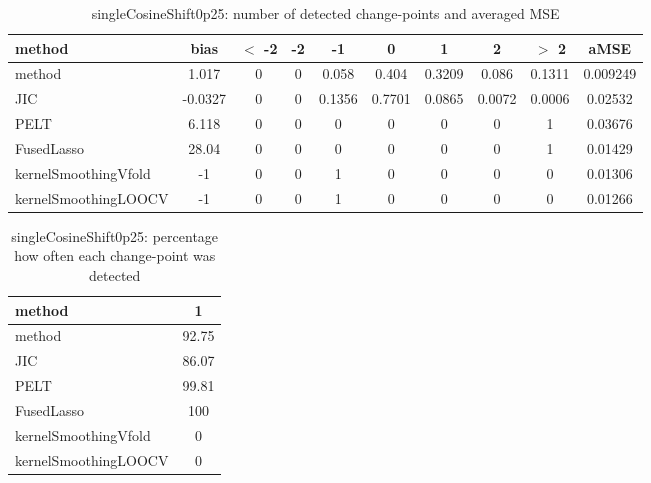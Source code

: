 \begin{table}[ht]
\centering
\begin{tabular}{l|c|ccccccc|c}
  \hline
method & bias & $<$ -2 & -2 & -1 & 0 & 1 & 2 & $>$ 2 & aMSE \\ 
  \hline
method & 1.017 &     0 &     0 & 0.058 & 0.404 & 0.3209 & 0.086 & 0.1311 & 0.009249 \\ 
  JIC & -0.0327 &     0 &     0 & 0.1356 & 0.7701 & 0.0865 & 0.0072 & 0.0006 & 0.02532 \\ 
  PELT & 6.118 &     0 &     0 &     0 &     0 &     0 &     0 &     1 & 0.03676 \\ 
  FusedLasso & 28.04 &     0 &     0 &     0 &     0 &     0 &     0 &     1 & 0.01429 \\ 
  kernelSmoothingVfold &    -1 &     0 &     0 &     1 &     0 &     0 &     0 &     0 & 0.01306 \\ 
  kernelSmoothingLOOCV &    -1 &     0 &     0 &     1 &     0 &     0 &     0 &     0 & 0.01266 \\ 
   \hline
\end{tabular}
\caption{singleCosineShift0p25: number of detected change-points and averaged MSE} 
\label{tab:singleCosineShift0p25Njumps}
\end{table}
\begin{table}[ht]
\centering
\begin{tabular}{l|c}
  \hline
method & 1 \\ 
  \hline
method &  92.75 \\ 
  JIC &  86.07 \\ 
  PELT &  99.81 \\ 
  FusedLasso &    100 \\ 
  kernelSmoothingVfold &      0 \\ 
  kernelSmoothingLOOCV &      0 \\ 
   \hline
\end{tabular}
\caption{singleCosineShift0p25: percentage how often each change-point was detected} 
\label{tab:singleCosineShift0p25Detections}
\end{table}
